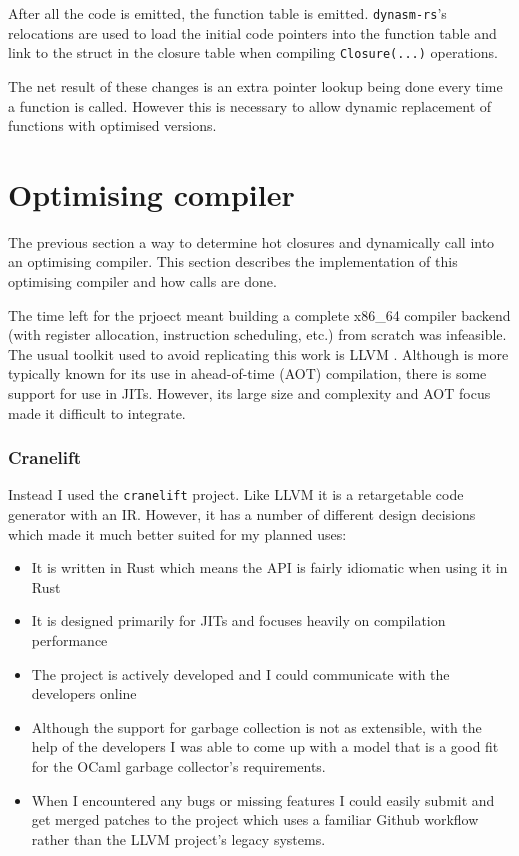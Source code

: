After all the code is emitted, the function table is emitted. \texttt{dynasm-rs}'s relocations are
used to load the initial code pointers into the function table and link to the struct in the
closure table when compiling \texttt{Closure(...)} operations.

The net result of these changes is an extra pointer lookup being done every time a function is
called. However this is necessary to allow dynamic replacement of functions with optimised
versions.

\section{Optimising compiler} \label{opt-comp}

The previous section a way to determine hot closures and dynamically call
into an optimising compiler. This section describes the implementation of this optimising compiler
and how calls are done.

The time left for the prjoect meant building a complete x86\_64 compiler backend (with register
allocation,
instruction scheduling, etc.) from scratch was infeasible. The usual toolkit used to avoid
replicating this work is LLVM \cite{llvm}. Although is more typically known for its use in
ahead-of-time (AOT) compilation, there is some support for use in JITs. However, its large size and
complexity and AOT focus made it difficult to integrate.

\subsubsection{Cranelift}

Instead I used the \texttt{cranelift} project. Like LLVM it is a retargetable code generator with
an IR. However, it has a number of different design decisions which made it much better suited for
my planned uses:

\begin{itemize}
      \item It is written in Rust which means the API is fairly idiomatic when using it in Rust
      \item It is designed primarily for JITs and focuses heavily on compilation performance
      \item The project is actively developed and I could communicate with the developers online
      \item Although the support for garbage collection is not as extensible, with the help of the
            developers I was able to come up with a model that is a good fit for the OCaml garbage
            collector's
            requirements.
      \item When I encountered any bugs or missing features I could easily submit and get merged
            patches to the project which uses a familiar Github workflow rather than the LLVM
            project's legacy
            systems.
\end{itemize}

